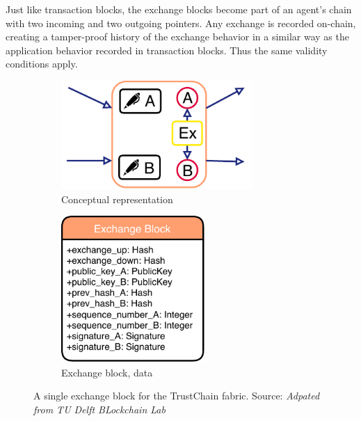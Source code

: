 Just like transaction blocks, the exchange blocks become part of an agent's chain with two incoming
and two outgoing pointers. Any exchange is recorded on-chain, creating a tamper-proof history 
of the exchange behavior in a similar way as the application behavior recorded in transaction blocks.
Thus the same validity conditions apply. 

\begin{figure}
    \centering
    \begin{subfigure}{0.49\textwidth}
        \centering
        \includegraphics[width=0.8\textwidth]{images/exchange_block.pdf}
        \caption{Conceptual representation}
        \label{fig:exchange_block_conceptual}
    \end{subfigure}
    \begin{subfigure}{0.49\textwidth}
        \centering
        \includegraphics[width=0.6\textwidth]{images/exchange_block_data.pdf}
        \caption{Exchange block, data}
        \label{fig:exchange_block_data}
    \end{subfigure}
    \caption{A single exchange block for the TrustChain fabric. Source: \textit{Adpated from TU Delft BLockchain Lab}}
    \label{fig:exchange_block}
\end{figure}

